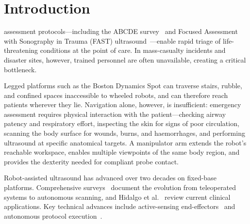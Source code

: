 \section{Introduction}
\label{sec:introduction}

 assessment protocols---including the \ac{ABCDE}
survey~\cite{thim2012abcde} and Focused Assessment with Sonography in Trauma (\ac{FAST})
ultrasound~\cite{rozycki1996}---enable rapid triage of life-threatening
conditions at the point of care. In mass-casualty
incidents and disaster sites, however, trained personnel are often unavailable,
creating a critical bottleneck.

Legged platforms such as the Boston Dynamics Spot can traverse stairs, rubble,
and confined spaces inaccessible to wheeled robots, and can therefore reach
patients wherever they lie. Navigation alone, however, is insufficient:
emergency assessment requires physical interaction with the patient---checking
airway patency and respiratory effort, inspecting the skin for signs of poor
circulation, scanning the body surface for wounds, burns, and haemorrhages, and
performing ultrasound at specific anatomical targets. A manipulator arm extends the robot's reachable
workspace, enables multiple viewpoints of the same body region, and provides the
dexterity needed for compliant probe contact.


Robot-assisted ultrasound has advanced over two decades on fixed-base
platforms. Comprehensive surveys~\cite{vonhaxthausen2021,li2021overview}
document the evolution from teleoperated systems to autonomous scanning, and
Hidalgo et al.~\cite{hidalgo2023} review current clinical applications. Key
technical advances include active-sensing end-effectors~\cite{ma2022} and
autonomous protocol execution~\cite{suligoj2021,farsoni2025autonomous}. 


